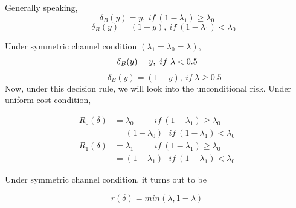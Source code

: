 \documentclass[a4paper,english,12pt]{article}
\begin{document}
\begin{exmp}
Generally speaking,\\
\begin{equation}
\delta_{B}(y)=y,~if~(1-\lambda_1)\geq\lambda_0
\end{equation}
\begin{equation}
~~~~~~~\delta_{B}(y)=\left( 1-y\right), ~if~(1-\lambda_1)<\lambda_0
\end{equation}

Under symmetric channel condition $(\lambda_1=\lambda_0=\lambda)$,
\begin{equation}
\delta_{B}(y)=y,~if~\lambda< 0.5\\
\end{equation}
\begin{equation}
~~~~~~~~\delta_{B}(y)=\left( 1-y\right), ~if~\lambda\geq0.5
\end{equation}
Now, under this decision rule, we will look into the unconditional risk. Under uniform cost condition, 

\begin{align}
R_0(\delta)&=\lambda_0~~~~~~~~~~~if~(1-\lambda_1)\geq\lambda_0 \\
&=\left( 1-\lambda_0\right)~~~if~(1-\lambda_1)<\lambda_0
\end{align}
\begin{align}
R_1(\delta)&=\lambda_1~~~~~~~~~~~if~(1-\lambda_1)\geq\lambda_0 \\
&=\left( 1-\lambda_1\right)~~~if~(1-\lambda_1)<\lambda_0
\end{align}

Under symmetric channel condition, it turns out to be 

\centering
\begin{equation}
r(\delta)= min\left( \lambda,1-\lambda\right)
\end{equation}
\end{exmp}
\end{document}
